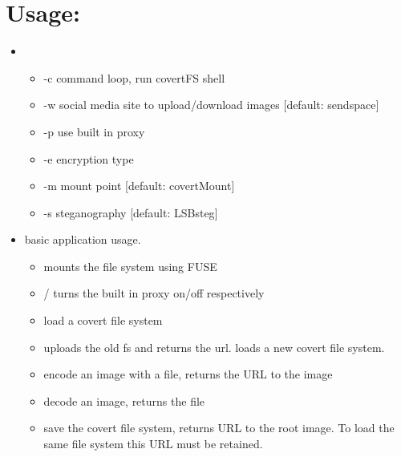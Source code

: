 \documentclass[letterpaper,10pt,english]{sphinxmanual}
\begin{document}
\chapter{Usage:}
\label{index:usage}\begin{itemize}
\item {} 
 \footnotemark[1]
\begin{itemize}
\item {} 
-c command loop, run covertFS shell

\item {} 
-w social media site to upload/download images {[}default: sendspace{]}

\item {} 
-p use built in proxy

\item {} 
-e encryption type

\item {} 
-m mount point {[}default: covertMount{]}

\item {} 
-s steganography {[}default: LSBsteg{]}

\end{itemize}

\item {} 
 basic application usage.
\begin{itemize}
\item {} 
 mounts the file system using FUSE

\item {} 
 /  turns the built in proxy on/off respectively

\item {} 
 load a covert file system

\item {} 
 uploads the old fs and returns the url. loads a new covert file system.

\item {} 
 encode an image with a file, returns the URL to the image

\item {} 
 decode an image, returns the file

\item {} 
 save the covert file system, returns URL to the root image. To load the same file system this URL must be retained.


\end{itemize}
\end{itemize}
\end{document}
